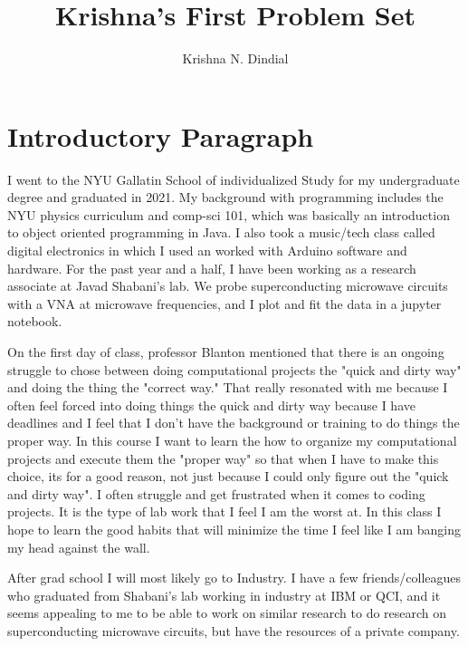 \documentclass[11pt]{article}
\title{Krishna's First Problem Set}
\author{Krishna N. Dindial}
\begin{document}
\maketitle


\section{Introductory Paragraph}
\label{sec:intro}

I went to the NYU Gallatin School of individualized Study for my undergraduate degree and graduated in 2021. My background with programming includes the NYU physics curriculum and comp-sci 101, which was basically an introduction to object oriented programming in Java. I also took a music/tech class called digital electronics in which I used an worked with Arduino software and hardware. For the past year and a half, I have been working as a research associate at Javad Shabani's lab. We probe superconducting microwave circuits with a VNA at microwave frequencies, and I plot and fit the data in a jupyter notebook.
\par On the first day of class, professor Blanton mentioned that there is an ongoing struggle to chose between doing computational projects the "quick and dirty way" and doing the thing the "correct way." That really resonated with me because I often feel forced into doing things the quick and dirty way because I have deadlines and I feel that I don't have the background or training to do things the proper way. In this course I want to learn the how to organize my computational projects and execute them the "proper way" so that when I have to make this choice, its for a good reason, not just because I could only figure out the "quick and dirty way". I often struggle and get frustrated when it comes to coding projects. It is the type of lab work that I feel I am the worst at. In this class I hope to learn the good habits that will minimize the time I feel like I am banging my head against the wall.
\par After grad school I will most likely go to Industry. I have a few friends/colleagues who graduated from Shabani's lab working in industry at IBM or QCI, and it seems appealing to me to be able to work on similar research to do research on superconducting microwave circuits, but have the resources of a private company.
\end{document}
